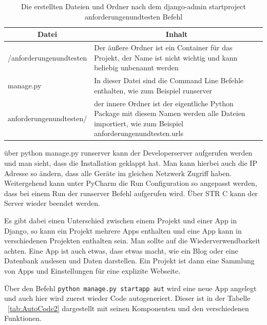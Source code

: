 \documentclass[11pt,a4paper]{report}
\begin{document}
\begin{table}
\centering
\begin{tabular}{|p{}|p{}|}
\hline
\multicolumn{1}{|c|}{\textbf{Datei}} & 
\multicolumn{1}{|c|}{\textbf{Inhalt}} \\\hline
/anforderungenundtesten & Der äußere Ordner ist ein Container für das Projekt, der Name ist nicht wichtig und kann beliebig unbenannt werden\\\hline
manage.py     & In dieser Datei sind die Command Line Befehle enthalten, wie zum Beispiel runserver \\\hline
anforderungenundtesten/    & der innere Ordner ist der eigentliche Python Package mit diesem Namen werden alle Dateien importiert, wie zum Beispiel anforderungenundtesten.urls \\\hline   
\end{tabular}
\caption{Die erstellten Dateien und Ordner nach dem django-admin startproject anforderungenundtesten Befehl}
\label{tab:AutoCode}
\end{table}




über python manage.py runserver kann der Developerserver aufgerufen werden und man sieht, dass die Installation geklappt hat. Man kann hierbei auch die IP Adresse so ändern, dass alle Geräte im gleichen Netzwerk Zugriff haben. Weitergehend kann unter PyCharm die Run Configuration so angepasst werden, dass bei einem Run der runserver Befehl aufgerufen wird. Über STR C kann der Server wieder beendet werden.


Es gibt dabei einen Unterschied zwischen einem Projekt und einer App in Django, so kann ein Projekt mehrere Apps enthalten und eine App kann in verschiedenen Projekten enthalten sein. Man sollte auf die Wiederverwendbarkeit achten. Eine App ist auch etwas, dass etwas macht, wie ein Blog oder eine Datenbank auslesen und Daten darstellen. Ein Projekt ist dann eine Sammlung von Apps und Einstellungen für eine explizite Webseite.

Über den Befehl \verb|python manage.py startapp aut| wird eine neue App angelegt und auch hier wird zuerst wieder Code autogeneriert. Dieser ist in der Tabelle ~\ref{tab:AutoCode2} dargestellt mit seinen Komponenten und den verschiedenen Funktionen.
\end{document}
